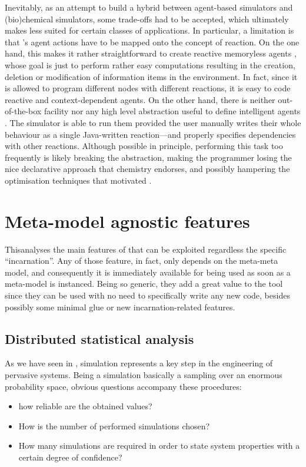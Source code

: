 \documentclass[12pt,a4paper,twoside,openright]{book}
\begin{document}
Inevitably, as an attempt to build a hybrid between agent-based simulators and (bio)chemical simulators, some trade-offs had to be accepted, which ultimately makes \alchemist{} less suited for certain classes of applications.
%
In particular, a limitation is that \alchemist{}'s agent actions have to be mapped onto the concept of reaction. 
%
On the one hand, this makes it rather straightforward to create reactive memoryless agents \cite{BandiniJASSS2009}, whose goal is just to perform rather easy computations resulting in the creation, deletion or modification of information items in the environment.
%
In fact, since it is allowed to program different nodes with different reactions, it is easy to code reactive and context-dependent agents. On the other hand, there is neither out-of-the-box facility nor any high level abstraction useful to define intelligent agents \cite{BandiniJASSS2009}. The simulator is able to run them provided the user manually writes their whole behaviour as a single Java-written reaction---and properly specifies dependencies with other reactions.
%
Although possible in principle, performing this task too frequently is likely breaking the \alchemist{} abstraction, making the programmer losing the nice declarative approach that chemistry endorses, and possibly hampering the optimisation techniques that motivated \alchemist{}.

\chapter{Meta-model agnostic features}

This\levelText{}analyses the main features of \alchemist{} that can be exploited regardless the specific ``incarnation''.
%
Any of those feature, in fact, only depends on the meta-meta model, and consequently it is immediately available for being used as soon as a meta-model is instanced.
%
Being so generic, they add a great value to the tool since they can be used with no need to specifically write any new code, besides possibly some minimal glue or new incarnation-related features.

\section{Distributed statistical analysis}

As we have seen in , simulation represents a key step in the engineering of pervasive systems.
%
Being a simulation basically a sampling over an enormous probability space, obvious questions accompany these procedures:
\begin{itemize}
 \item how reliable are the obtained values?
 \item How is the number of performed simulations chosen?
 \item How many simulations are required in order to state system properties with a certain degree of confidence?
\end{itemize}
\end{document}
